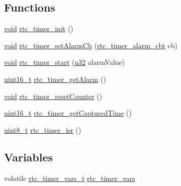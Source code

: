 \subsection*{Functions}
\begin{DoxyCompactItemize}
\item 
\hyperlink{usb__devapi_8h_afabf60e7f57651d6d595a02c75f07cd0}{void} \hyperlink{iot-lab___m3_2rtc__timer_8c_a2fec25529d64392ec0e05e82ae1a6d3d}{rtc\+\_\+timer\+\_\+init} ()
\item 
\hyperlink{usb__devapi_8h_afabf60e7f57651d6d595a02c75f07cd0}{void} \hyperlink{iot-lab___m3_2rtc__timer_8c_a76ad10e60d7fd22eedc47abfb9099501}{rtc\+\_\+timer\+\_\+set\+Alarm\+Cb} (\hyperlink{openmotestm_2rtc__timer_8h_ae333b9179d396f03c9fc63b5692bc33a}{rtc\+\_\+timer\+\_\+alarm\+\_\+cbt} cb)
\item 
\hyperlink{usb__devapi_8h_afabf60e7f57651d6d595a02c75f07cd0}{void} \hyperlink{iot-lab___m3_2rtc__timer_8c_a016c61490a05f2bb2ab2f09a56cd5df0}{rtc\+\_\+timer\+\_\+start} (\hyperlink{agilefox_2library_2inc_2stm32f10x__type_8h_a2caf5cd7bcdbe1eefa727f44ffb10bac}{u32} alarm\+Value)
\item 
\hyperlink{_p_e___types_8h_a1f1825b69244eb3ad2c7165ddc99c956}{uint16\+\_\+t} \hyperlink{iot-lab___m3_2rtc__timer_8c_a259e703f234a5698cde733bb44d404c8}{rtc\+\_\+timer\+\_\+get\+Alarm} ()
\item 
\hyperlink{usb__devapi_8h_afabf60e7f57651d6d595a02c75f07cd0}{void} \hyperlink{iot-lab___m3_2rtc__timer_8c_a854dc3c4ddfb1c44e137ce07e1aeccd8}{rtc\+\_\+timer\+\_\+reset\+Counter} ()
\item 
\hyperlink{_p_e___types_8h_a1f1825b69244eb3ad2c7165ddc99c956}{uint16\+\_\+t} \hyperlink{iot-lab___m3_2rtc__timer_8c_a0aa4605ced8faece6860083541548831}{rtc\+\_\+timer\+\_\+get\+Captured\+Time} ()
\item 
\hyperlink{_p_e___types_8h_aba7bc1797add20fe3efdf37ced1182c5}{uint8\+\_\+t} \hyperlink{iot-lab___m3_2rtc__timer_8c_a1e8d1aba2a068073562381de0bba40ac}{rtc\+\_\+timer\+\_\+isr} ()
\end{DoxyCompactItemize}
\subsection*{Variables}
\begin{DoxyCompactItemize}
\item 
volatile \hyperlink{structrtc__timer__vars__t}{rtc\+\_\+timer\+\_\+vars\+\_\+t} \hyperlink{iot-lab___m3_2rtc__timer_8c_ab5859ed0606df1d431471ed50bb1ec73}{rtc\+\_\+timer\+\_\+vars}
\end{DoxyCompactItemize}


